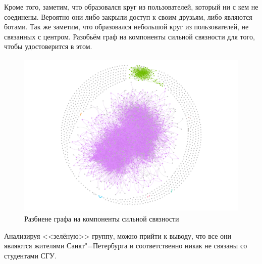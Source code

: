 Кроме того, заметим, что образовался круг из пользователей, который ни с кем не соединены. Вероятно они либо закрыли доступ к своим друзьям, либо являются ботами. Так же заметим, что образовался небольшой круг из пользователей, не связанных с центром. Разобьём граф на компоненты сильной связности для того, чтобы удостоверится в этом.
\begin{figure}[H]
    \centering
    \includegraphics[height = 8cm]{pictures/Strongly component.pdf}
    \caption{Разбиене графа на компоненты сильной связности}
    \label{fig:graph_strong_comp}
\end{figure}
Анализируя <<зелёную>> группу, можно прийти к выводу, что все они являются жителями Санкт"=Петербурга и соответственно никак не связаны со студентами СГУ.


